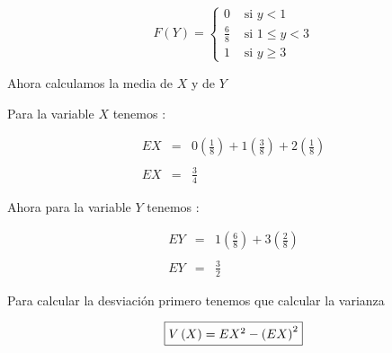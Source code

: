 \documentclass[12pt]{article}
\begin{document}
    \begin{equation*}
        F\left(Y\right) = \begin{cases}
            0 &\mbox{ si   $y < 1 $}
            \\
            \frac{6}{8} & \mbox{ si   $1\leq y < 3$}
            \\
            1 & \mbox{ si   $y\geq 3$}
        \end{cases}
    \end{equation*}

    \begin{flushleft}
        Ahora calculamos la media de $X$ y de $Y$
    \end{flushleft}

    \begin{flushleft}
        Para la variable $X$ tenemos : 
    \end{flushleft}
    \begin{equation*}
        \begin{array}{rcl}
            EX & = & \displaystyle 0 \left(\frac{1}{8}\right) + 1 \left(\frac{3}{8}\right) + 2 \left(\frac{1}{8}\right)
            \\
            \\
            EX & = &\displaystyle \frac{3}{4}
        \end{array}
    \end{equation*}

    \begin{flushleft}
        Ahora para la variable $Y$ tenemos : 
    \end{flushleft}
    \begin{equation*}
        \begin{array}{rcl}
            EY & = & \displaystyle 1 \left(\frac{6}{8}\right) + 3 \left(\frac{2}{8}\right)
            \\
            \\
            EY & = &\displaystyle \frac{3}{2}
        \end{array}
    \end{equation*}

    \begin{flushleft}
        Para calcular la desviaci\'on primero tenemos que calcular la varianza 
    \end{flushleft}

    \begin{equation*}
        \fbox{$V\left(X\right) = EX^2 - \left(EX\right)^2
        $}
    \end{equation*}
\end{document}
